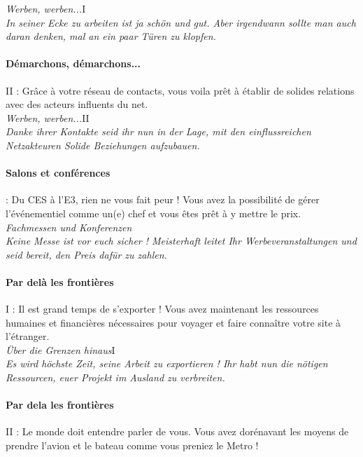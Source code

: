 \documentclass[10pt,a4paper]{article}
\begin{document}
\textit{Werben, werben...}I\\
\textit{In seiner Ecke zu arbeiten ist ja schön und gut. Aber irgendwann sollte man auch daran denken, mal an ein paar Türen zu klopfen.}


\paragraph{Démarchons, démarchons...} II : Grâce à votre réseau de contacts, vous voila prêt à établir de solides relations avec des acteurs influents du net.\\

\textit{Werben, werben...}II\\
\textit{Danke ihrer Kontakte seid ihr nun in der Lage, mit den einflussreichen Netzakteuren Solide Beziehungen aufzubauen.}


\paragraph{Salons et conférences} : Du CES à l'E3, rien ne vous fait peur ! Vous avez la possibilité de gérer l'événementiel comme un(e) chef et vous êtes prêt à y mettre le prix.\\

\textit{Fachmessen und Konferenzen}\\
\textit{Keine Messe ist vor euch sicher ! Meisterhaft leitet Ihr Werbeveranstaltungen und seid bereit, den Preis dafür zu zahlen.}


\paragraph{Par delà les frontières} I : Il est grand temps de s'exporter ! Vous avez maintenant les ressources humaines et financières nécessaires pour voyager et faire connaître votre site à l'étranger.\\

\textit{Über die Grenzen hinaus}I\\
\textit{Es wird höchste Zeit, seine Arbeit zu exportieren ! Ihr habt nun die nötigen Ressourcen, euer Projekt im Ausland zu verbreiten.}


\paragraph{Par dela les frontières} II : Le monde doit entendre parler de vous. Vous avez dorénavant les moyens de prendre l'avion et le bateau comme vous preniez le Metro !\\
\end{document}
